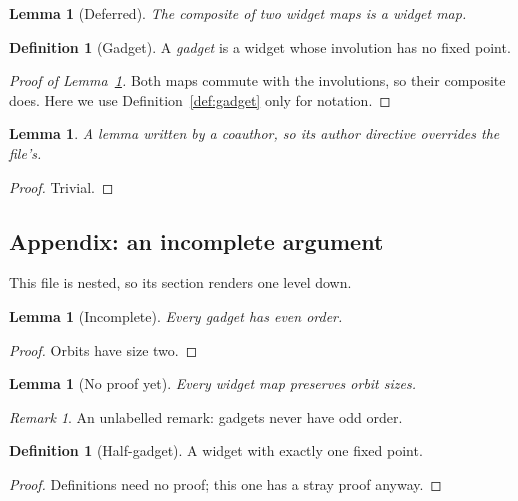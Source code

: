 \documentclass{amsart}
\providecommand{\uses}[1]{}
\providecommand{\incomplete}[1]{}
\theoremstyle{plain}
\newtheorem{lemma}[theorem]{Lemma}
\theoremstyle{definition}
\newtheorem{definition}[theorem]{Definition}
\theoremstyle{remark}
\newtheorem{remark}[theorem]{Remark}
\begin{document}

\begin{lemma}[Deferred]\label{sy-0007}
The composite of two widget maps is a widget map.
\end{lemma}


\begin{definition}[Gadget]\label{sy-0008}\label{def:gadget}\label{defn:gadget-old}
A \emph{gadget} is a widget whose involution has no fixed point.
\end{definition}


\begin{proof}[Proof of Lemma~\ref{sy-0007}]
\uses{sy-0001}
Both maps commute with the involutions, so their composite does. Here we use Definition~\ref{def:gadget} only for notation.
\end{proof}

\begin{lemma}\label{sy-0202}
A lemma written by a coauthor, so its author directive overrides the file's.
\end{lemma}
\begin{proof}
Trivial.
\end{proof}


\subsection{Appendix: an incomplete argument}\label{sy-0300}

This file is nested, so its section renders one level down.

\begin{lemma}[Incomplete]\label{sy-000C}
Every gadget has even order.
\end{lemma}
\begin{proof}
\uses{sy-0008}
Orbits have size two. \incomplete{Show that there are no fixed points using Definition~\ref{sy-0008}.}
\end{proof}

\begin{lemma}[No proof yet]\label{sy-000D}
Every widget map preserves orbit sizes.
\end{lemma}

\begin{remark}
An unlabelled remark: gadgets never have odd order.
\end{remark}

\begin{definition}[Half-gadget]\label{sy-000E}
A widget with exactly one fixed point.
\end{definition}
\begin{proof}
Definitions need no proof; this one has a stray proof anyway.
\end{proof}
\end{document}
